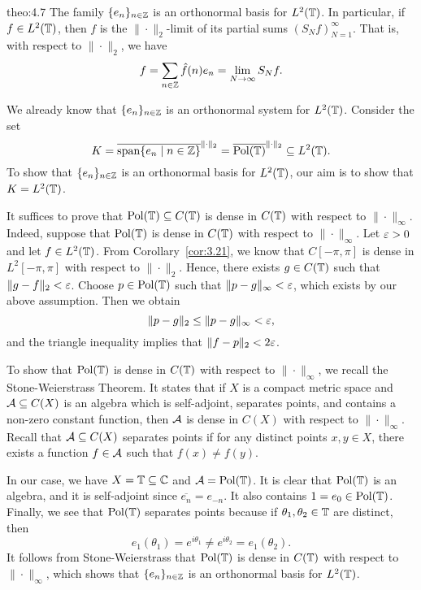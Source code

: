 \begin{theo}{theo:4.7}
    The family $\{e_n\}_{n\in\mathbb{Z}}$ is an orthonormal basis for $L^2(\mathbb{T})$. 
    In particular, if $f \in L^2(\mathbb{T})$, then $f$ is the $\|\cdot\|_2$-limit 
    of its partial sums $(S_Nf)_{N=1}^\infty$. That is, with respect to 
    $\|\cdot\|_2$, we have 
    \[ f = \sum_{n\in\mathbb{Z}} \hat f(n) e_n = \lim_{N\to\infty} S_N f. \] 
\end{theo}
\begin{pf}
    We already know that $\{e_n\}_{n\in\mathbb{Z}}$ is an orthonormal system for 
    $L^2(\mathbb{T})$. Consider the set 
    \[ K = \overline{\operatorname{span}\{e_n \mid n \in \mathbb{Z}\}}^{\|\cdot\|_2} 
    = \overline{\operatorname{Pol}(\mathbb{T})}^{\|\cdot\|_2} \subseteq L^2(\mathbb{T}). \] 
    To show that $\{e_n\}_{n\in\mathbb{Z}}$ is an orthonormal basis for $L^2(\mathbb{T})$, 
    our aim is to show that $K = L^2(\mathbb{T})$. 
    
    It suffices to prove that $\operatorname{Pol}(\mathbb{T}) \subseteq C(\mathbb{T})$ is dense 
    in $C(\mathbb{T})$ with respect to $\|\cdot\|_\infty$. Indeed, suppose that 
    $\operatorname{Pol}(\mathbb{T})$ is dense in $C(\mathbb{T})$ with respect to $\|\cdot\|_\infty$. 
    Let $\varepsilon > 0$ and let $f \in L^2(\mathbb{T})$. From Corollary~\ref{cor:3.21}, 
    we know that $C[-\pi, \pi]$ is dense in $L^2[-\pi, \pi]$ with respect 
    to $\|\cdot\|_2$. Hence, there exists $g \in C(\mathbb{T})$ such that 
    $\|g - f\|_2 < \varepsilon$. Choose $p \in \operatorname{Pol}(\mathbb{T})$ such that $\|p - g\|_\infty 
    < \varepsilon$, which exists by our above assumption. Then we obtain 
    \[ \|p - g\|_2 \leq \|p - g\|_\infty < \varepsilon, \] 
    and the triangle inequality implies that $\|f - p\|_2 < 2\varepsilon$. 

    To show that $\operatorname{Pol}(\mathbb{T})$ is dense in $C(\mathbb{T})$ with respect to 
    $\|\cdot\|_\infty$, we recall the Stone-Weierstrass Theorem. 
    It states that if $X$ is a compact metric space and ${\cal A} \subseteq C(X)$
    is an algebra which is self-adjoint, separates points, and contains a 
    non-zero constant function, then ${\cal A}$ is dense in $C(X)$ with respect 
    to $\|\cdot\|_\infty$. Recall that ${\cal A} \subseteq C(X)$ separates 
    points if for any distinct points $x, y \in X$, there exists a 
    function $f \in {\cal A}$ such that $f(x) \neq f(y)$. 

    In our case, we have $X = \mathbb{T} \subseteq \mathbb{C}$ and ${\cal A} = \operatorname{Pol}(\mathbb{T})$. 
    It is clear that $\operatorname{Pol}(\mathbb{T})$ is an algebra, and it is self-adjoint 
    since $\overline{e_n} = e_{-n}$. It also contains $1 = e_0 \in \operatorname{Pol}(\mathbb{T})$. 
    Finally, we see that $\operatorname{Pol}(\mathbb{T})$ separates points because if 
    $\theta_1, \theta_2 \in \mathbb{T}$ are distinct, then 
    \[ e_1(\theta_1) = e^{i\theta_1} \neq e^{i\theta_2} = e_1(\theta_2). \] 
    It follows from Stone-Weierstrass that $\operatorname{Pol}(\mathbb{T})$ is dense in $C(\mathbb{T})$ 
    with respect to $\|\cdot\|_\infty$, which shows that $\{e_n\}_{n\in\mathbb{Z}}$
    is an orthonormal basis for $L^2(\mathbb{T})$. 


\end{pf}
